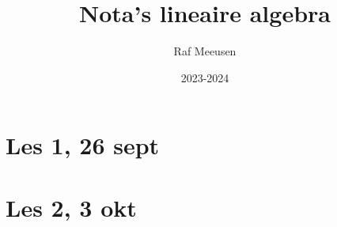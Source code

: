 \documentclass{article}
\title{Nota's lineaire algebra}
\author{Raf Meeusen}
\date{2023-2024}
\begin{document}
\maketitle

\section{Les 1, 26 sept}



\section{Les 2, 3 okt}
\end{document}
